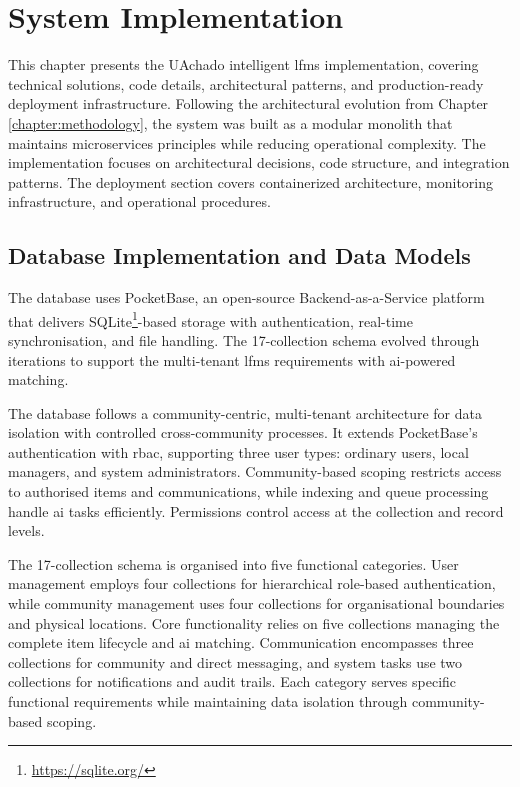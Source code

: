 \chapter{System Implementation} \label{chapter:implementation}

This chapter presents the UAchado intelligent \ac{lfms} implementation, covering technical solutions, code details, architectural patterns, and production-ready deployment infrastructure. Following the architectural evolution from Chapter \ref{chapter:methodology}, the system was built as a modular monolith that maintains microservices principles while reducing operational complexity. The implementation focuses on architectural decisions, code structure, and integration patterns. The deployment section covers containerized architecture, monitoring infrastructure, and operational procedures.


\section{Database Implementation and Data Models} \label{section:database_implementation}

The database uses PocketBase, an open-source Backend-as-a-Service platform that delivers SQLite\footnote{\url{https://sqlite.org/}}-based storage with authentication, real-time synchronisation, and file handling. The 17-collection schema evolved through iterations to support the multi-tenant \ac{lfms} requirements with \ac{ai}-powered matching.

The database follows a community-centric, multi-tenant architecture for data isolation with controlled cross-community processes. It extends PocketBase's authentication with \ac{rbac}, supporting three user types: ordinary users, local managers, and system administrators. Community-based scoping restricts access to authorised items and communications, while indexing and queue processing handle \ac{ai} tasks efficiently. Permissions control access at the collection and record levels.

The 17-collection schema is organised into five functional categories. User management employs four collections for hierarchical role-based authentication, while community management uses four collections for organisational boundaries and physical locations. Core functionality relies on five collections managing the complete item lifecycle and \ac{ai} matching. Communication encompasses three collections for community and direct messaging, and system tasks use two collections for notifications and audit trails. Each category serves specific functional requirements while maintaining data isolation through community-based scoping.

